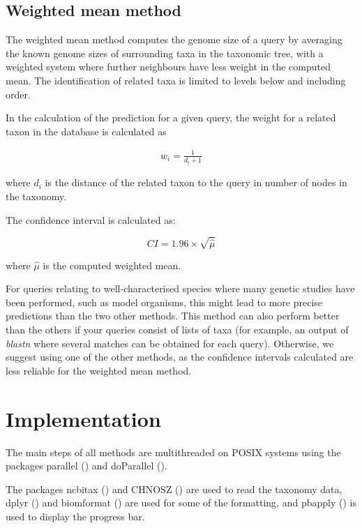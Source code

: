 \documentclass[
]{article}
\begin{document}
\subsection{Weighted mean method}\label{weighted-mean-method}

The weighted mean method computes the genome size of a query by
averaging the known genome sizes of surrounding taxa in the taxonomic
tree, with a weighted system where further neighbours have less weight
in the computed mean. The identification of related taxa is limited to
levels below and including order.

In the calculation of the prediction for a given query, the weight for a
related taxon in the database is calculated as

\begin{gather*}
w_i = \frac{1}{d_i + 1}
\end{gather*}

where \(d_i\) is the distance of the related taxon to the query in
number of nodes in the taxonomy.

The confidence interval is calculated as:

\begin{equation}
CI = 1.96 \times \sqrt{\hat{\mu}}
\end{equation}

where \(\hat{\mu}\) is the computed weighted mean.

For queries relating to well-characterised species where many genetic
studies have been performed, such as model organisms, this might lead to
more precise predictions than the two other methods. This method can
also perform better than the others if your queries consist of lists of
taxa (for example, an output of \emph{blastn} where several matches can
be obtained for each query). Otherwise, we suggest using one of the
other methods, as the confidence intervals calculated are less reliable
for the weighted mean method.

\section{Implementation}\label{implementation}

The main steps of all methods are multithreaded on POSIX systems using
the packages parallel () and
doParallel ().

The packages ncbitax () and
CHNOSZ () are used to read the
taxonomy data, dplyr ()
and biomformat () are used for some of the formatting, and pbapply
() is used to
display the progress bar.
\end{document}
